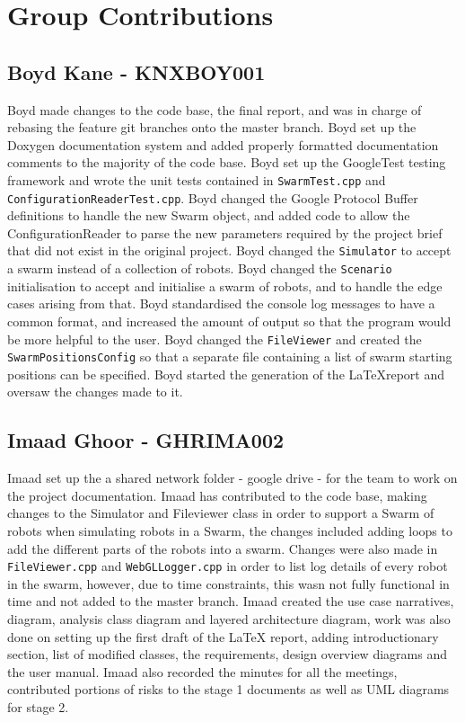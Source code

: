 \documentclass[11pt,a4paper]{article}
\begin{document}
\section{Group Contributions}
\label{s:group-contributions}

\subsection{Boyd Kane - KNXBOY001}
Boyd made changes to the code base, the final report, and was in charge of
rebasing the feature git branches onto the master branch. Boyd set up the
Doxygen documentation system and added properly formatted documentation comments
to the majority of the code base. Boyd set up the GoogleTest testing framework
and wrote the unit tests contained in \texttt{SwarmTest.cpp} and
\texttt{ConfigurationReaderTest.cpp}. Boyd changed the Google Protocol Buffer
definitions to handle the new Swarm object, and added code to allow the
ConfigurationReader to parse the new parameters required by the project brief
that did not exist in the original project. Boyd changed the
\texttt{Simulator} to accept a swarm instead of a collection of robots. Boyd
changed the \texttt{Scenario} initialisation to accept and initialise a swarm
of robots, and to handle the edge cases arising from that. Boyd standardised
the console log messages to have a common format, and increased the amount of
output so that the program would be more helpful to the user. Boyd changed the
\texttt{FileViewer} and created the \texttt{SwarmPositionsConfig} so that a
separate file containing a list of swarm starting positions can be specified.
Boyd started the generation of the \LaTeX report and oversaw the changes made
to it.

\subsection{Imaad Ghoor - GHRIMA002}
Imaad set up the a shared network folder - google drive - for the team to work 
on the project documentation. Imaad has contributed to the code base, making changes 
to the Simulator and Fileviewer class in order to support a Swarm of robots when 
simulating robots in a Swarm, the changes included adding loops to add the different parts 
of the robots into a swarm. Changes were also made in \texttt{FileViewer.cpp} and \texttt{WebGLLogger.cpp}
in order to list log details of every robot in the swarm, however, due to time constraints, this wasn not 
fully functional in time and not added to the master branch. Imaad created the use case narratives, diagram, 
analysis class diagram and layered architecture diagram, work was also done on setting 
up the first draft of the LaTeX report, adding introductionary section, list of modified classes,
the requirements, design overview diagrams and the user manual. Imaad also recorded the minutes for all the meetings,
contributed portions of risks to the stage 1 documents as well as UML diagrams for stage 2.
\end{document}
